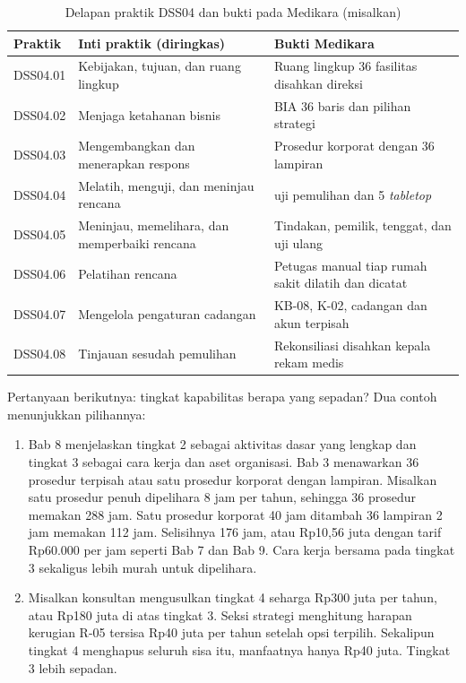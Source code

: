 \begin{table}[!htb]
  \centering\small
  \caption{Delapan praktik DSS04 dan bukti pada Medikara (misalkan)}\label{tab:ch10-dss04}
  \begin{tabularx}{\textwidth}{|>{\raggedright\arraybackslash}p{}|>{\raggedright\arraybackslash}X|>{\raggedright\arraybackslash}X|}
    \hline
    \textbf{Praktik} & \textbf{Inti praktik (diringkas)} & \textbf{Bukti Medikara} \\ \hline
    DSS04.01 & Kebijakan, tujuan, dan ruang lingkup & Ruang lingkup 36 fasilitas disahkan direksi
    \\ \hline
    DSS04.02 & Menjaga ketahanan bisnis & BIA 36 baris dan pilihan strategi \\ \hline
    DSS04.03 & Mengembangkan dan menerapkan respons & Prosedur korporat dengan 36 lampiran \\
    \hline
    DSS04.04 & Melatih, menguji, dan meninjau rencana & 144 uji pemulihan dan 5 \textit{tabletop}
    \\ \hline
    DSS04.05 & Meninjau, memelihara, dan memperbaiki rencana & Tindakan, pemilik, tenggat, dan uji
    ulang \\ \hline
    DSS04.06 & Pelatihan rencana & Petugas manual tiap rumah sakit dilatih dan dicatat \\ \hline
    DSS04.07 & Mengelola pengaturan cadangan & KB-08, K-02, cadangan dan akun terpisah \\ \hline
    DSS04.08 & Tinjauan sesudah pemulihan & Rekonsiliasi disahkan kepala rekam medis \\ \hline
  \end{tabularx}
\end{table}

Pertanyaan berikutnya: tingkat kapabilitas berapa yang sepadan? Dua contoh menunjukkan pilihannya:
\begin{enumerate}
  \item Bab 8 menjelaskan tingkat 2 sebagai aktivitas dasar yang lengkap dan tingkat 3 sebagai
  cara kerja dan aset organisasi. Bab 3 menawarkan 36 prosedur terpisah atau satu prosedur
  korporat dengan lampiran. Misalkan satu prosedur penuh dipelihara 8 jam per tahun, sehingga 36
  prosedur memakan 288 jam. Satu prosedur korporat 40 jam ditambah 36 lampiran 2 jam memakan 112
  jam. Selisihnya 176 jam, atau Rp10,56 juta dengan tarif Rp60.000 per jam seperti Bab 7 dan
  Bab 9. Cara kerja bersama pada tingkat 3 sekaligus lebih murah untuk dipelihara.
  \item Misalkan konsultan mengusulkan tingkat 4 seharga Rp300 juta per tahun, atau Rp180 juta di
  atas tingkat 3. Seksi strategi menghitung harapan kerugian R-05 tersisa Rp40 juta per tahun
  setelah opsi terpilih. Sekalipun tingkat 4 menghapus seluruh sisa itu, manfaatnya hanya Rp40
  juta. Tingkat 3 lebih sepadan.
\end{enumerate}


